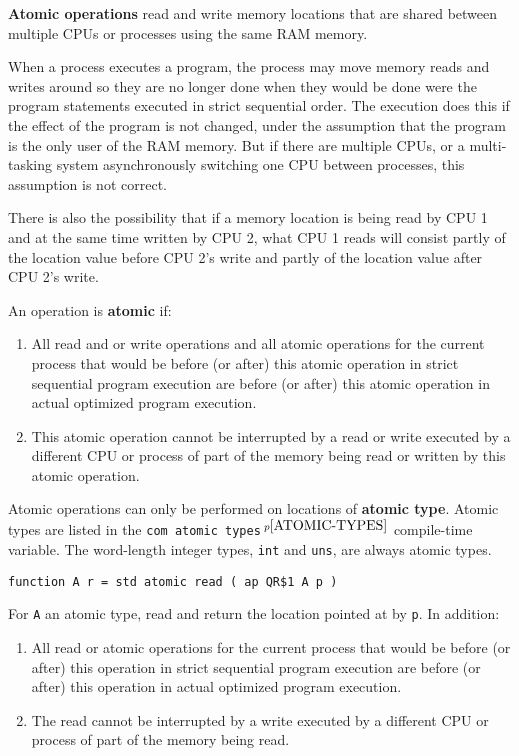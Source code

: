 \documentclass[12pt]{article}
\newcommand{\key}[1]{{\rm \bfseries #1}}
\newcommand{\pagnote}[1]{$\,^{p\pageref{#1}}$}
\newenvironment{indpar}[1][0.3in]%
	{\begin{list}{}%
		     {\setlength{\itemsep}{0in}%
		      \setlength{\topsep}{0in}%
		      \setlength{\parsep}{1ex}%
		      \setlength{\labelwidth}{#1}%
		      \setlength{\leftmargin}{#1}%
		      \addtolength{\leftmargin}{\labelsep}}%
	 \item}%
	{\end{list}}
\begin{document}
\key{Atomic operations} read and write memory locations
that are shared between multiple CPUs or processes
using the same RAM memory.

When a process executes a program, the process may move
memory reads and writes around so they are no longer
done when they would be done were the program
statements executed in strict sequential order.  The
execution does this if the effect of the program is not
changed, under the assumption that the program is the
only user of the RAM memory.  But if there are multiple CPUs,
or a multi-tasking system asynchronously switching one CPU
between processes, this assumption is not correct.

There is also the possibility that if a memory location is
being read by CPU 1 and at the same time written by CPU 2,
what CPU 1 reads will consist partly of the location value
before CPU 2's write and partly of the location value after
CPU 2's write.

An operation is \key{atomic} if:
\begin{indpar}
\begin{enumerate}
\item
All read and or write operations and all atomic operations
for the current process that would be
before (or after) this atomic operation in strict sequential program execution
are before (or after) this atomic operation
in actual optimized program execution.
\item
This atomic operation cannot be interrupted by a read or write executed by a
different CPU or process of part of the memory being read or written
by this atomic operation.
\end{enumerate}
\end{indpar}

Atomic operations can only be performed on locations of \key{atomic type}.
Atomic types are listed in the {\tt com atomic types}\pagnote{ATOMIC-TYPES}
compile-time variable.
The word-length integer types, {\tt int} and {\tt uns}, are
always atomic types.

{\tt function A r = std atomic read ( ap QR\$1 A p )}
\begin{indpar}
For {\tt A} an atomic type,
read and return the location pointed at by {\tt p}.  In addition:
\begin{enumerate}
\item
All read or atomic operations for the current process that would be
before (or after) this operation in strict sequential program execution
are before (or after) this operation in actual optimized program execution.
\item
The read cannot be interrupted by a write executed by a different CPU
or process of part of the memory being read.
\end{enumerate}
\end{indpar}
\end{document}
